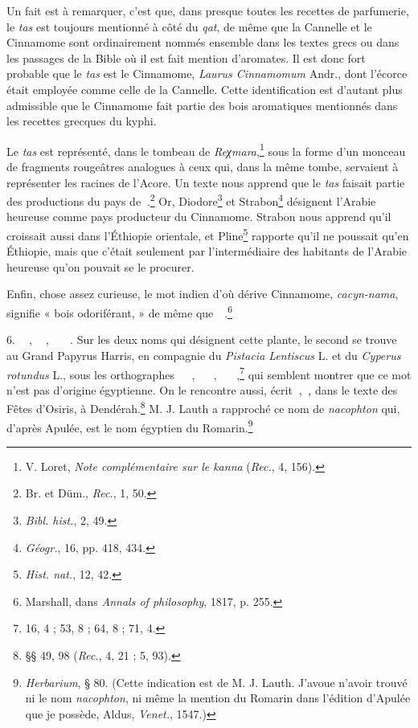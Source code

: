 \documentclass[a4paper, 11pt, oneside]{article}
\newcommand*\hieroAAAB{}
\newcommand*\hieroAAAI{}
\newcommand*\hieroAAAM{}
\newcommand*\hieroAAAR{}
\newcommand*\hieroAABT{}
\newcommand*\hieroAABV{}
\newcommand*\hieroAACY{}
\newcommand*\hieroAADK{}
\newcommand*\hieroAADL{}
\newcommand*\hieroAAFO{\raisebox{0.5ex}{}}
\newcommand*\hieroAAFW{}
\newcommand*\hieroAAGB{}
\newcommand*\hieroAAGE{}
\newcommand*\hieroAAGJ{}
\newcommand*\hieroAAHH{}
\newcommand*\hieroAAHL{}
\newcommand*\hieroAAHV{}
\newcommand*\hieroAAHW{}
\newcommand*\hieroAAIW{}
\newcommand*\hieroAAUQ{}
\newcommand*\hieroAAVX{}
\newcommand*\hieroAAVY{}
\newcommand*\hieroAAVZ{}
\newcommand*\hieroAAWA{}
\newcommand*\hieroAAWB{}
\begin{document}
Un fait est à remarquer, c'est que, dans presque toutes les recettes de parfumerie, le \emph{tas} est toujours mentionné à côté du \emph{qat}, de même que la Cannelle et le Cinnamome sont ordinairement nommés ensemble dans les textes grecs ou dans les passages de la Bible où il est fait mention d'aromates. Il est donc fort probable que le \emph{tas} est le Cinnamome, \emph{Laurus Cinnamomum} Andr., dont l'écorce était employée comme celle de la Cannelle. Cette identification est d'autant plus admissible que le Cinnamome fait partie des bois aromatiques mentionnés dans les recettes grecques du kyphi.

Le \emph{tas} est représenté, dans le tombeau de \emph{Reχmara},\footnote{V. Loret, \emph{Note complémentaire sur le kanna} (\emph{Rec.}, 4, 156).} sous la forme d'un monceau de fragments rougeâtres analogues à ceux qui, dans la même tombe, servaient à représenter les racines de l'Acore. Un texte nous apprend que le \emph{tas} faisait partie des productions du pays de $\hieroAAAI\:\hieroAAVX$.\footnote{Br. et Düm., \emph{Rec.}, 1, 50.} Or, Diodore\footnote{\emph{Bibl. hist.}, 2, 49.} et Strabon\footnote{\emph{Géogr.}, 16, pp. 418, 434.} désignent l'Arabie heureuse comme pays producteur du Cinnamome. Strabon nous apprend qu'il croissait aussi dans l'Éthiopie orientale, et Pline\footnote{\emph{Hist. nat.}, 12, 42.} rapporte qu'il ne poussait qu'en Éthiopie, mais que c'était seulement par l'intermédiaire des habitants de l'Arabie heureuse qu'on pouvait se le procurer.

Enfin, chose assez curieuse, le mot indien d'où dérive Cinnamome, \emph{cacyn-nama}, signifie « bois odoriférant, » de même que $\hieroAAHL\:\hieroAADK\:\hieroAADK\:\hieroAABV$.\footnote{Marshall, dans \emph{Annals of philosophy}, 1817, p. 255.}

6. $\hieroAAGE\:\hieroAAAB\:\hieroAAAM\:\hieroAAAM\:\hieroAAAR$, $\hieroAAGJ\:\hieroAAAB\:\hieroAAAM\:\hieroAAAM\:\hieroAADL$, $\hieroAAGE\:\hieroAAAB\:\hieroAAAM\:\hieroAAAM\:\hieroAABV\:\hieroAAHH\:\hieroAAHV\:\hieroAAHW$. Sur les deux noms qui désignent cette plante, le second se trouve au Grand Papyrus Harris, en compagnie du \emph{Pistacia Lentiscus} L. et du \emph{Cyperus rotundus} L., sous les orthographes $\hieroAAVY\:\hieroAAIW\:\hieroAAAB\:\hieroAAGB\:\hieroAAAM\:\hieroAAFO$, $\hieroAAVY\:\hieroAAVZ\:\hieroAAAB\:\hieroAAGB\:\hieroAAAM\:\hieroAAUQ\:\hieroAABT$, $\hieroAAVY\:\hieroAAIW\:\hieroAAAB\:\hieroAAGB\:\hieroAAAM\:\hieroAACY\:\hieroAAFO$,\footnote{16, 4 ; 53, 8 ; 64, 8 ; 71, 4.} qui semblent montrer que ce mot n'est pas d'origine égyptienne. On le rencontre aussi, écrit $\hieroAAWA\:\hieroAAWB$, $\hieroAAHV\:\hieroAAFW$, dans le texte des Fêtes d'Osiris, à Dendérah.\footnote{§§ 49, 98 (\emph{Rec.}, 4, 21 ; 5, 93).} M. J. Lauth a rapproché ce nom de \emph{nacophton} qui, d'après Apulée, est le nom égyptien du Romarin.\footnote{\emph{Herbarium}, § 80. (Cette indication est de M. J. Lauth. J'avoue n'avoir trouvé ni le nom \emph{nacophton}, ni même la mention du Romarin dans l'édition d'Apulée que je possède, Aldus, \emph{Venet.}, 1547.)}
\end{document}
